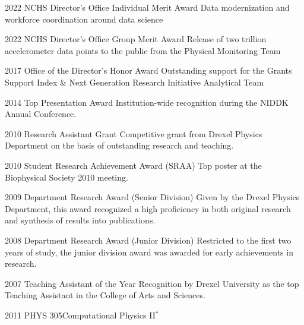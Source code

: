 \documentclass[]{scrartcl}
\begin{document}
\begin{cleanCV}

\newpage


\WorkExperienceX
{2022}
{NCHS Director's Office Individual Merit Award}
{Data modernization and workforce coordination around data science}

\WorkExperienceX
{2022}
{NCHS Director's Office Group Merit Award}
{Release of two trillion accelerometer data points to the public from the Physical Monitoring Team}

\WorkExperienceX
{2017}
{Office of the Director's Honor Award}
{Outstanding support for the Grants Support Index \& Next Generation Research Initiative Analytical Team}

\WorkExperienceX
{2014}
{Top Presentation Award}
{Institution-wide recognition during the NIDDK Annual Conference.}

\WorkExperienceX
{2010}
{Research Assistant Grant}
{Competitive grant from Drexel Physics Department on the basis of outstanding research and teaching.}

\WorkExperienceX
{2010}
{Student Research Achievement Award (SRAA)}
{Top poster at the Biophysical Society 2010 meeting. }

\WorkExperienceX
{2009}
{Department Research Award (Senior Division)}
{Given by the Drexel Physics Department, this award recognized a high proficiency in both original research and synthesis of results into publications.}

\WorkExperienceX
{2008}
{Department Research Award (Junior Division)}
{Restricted to the first two years of study, the junior division award was awarded for early achievements in research.}

\WorkExperienceX
{2007}
{Teaching Assistant of the Year}
{Recognition by Drexel University as the top Teaching Assistant in the College of Arts and Sciences.}







\newcommand{\TeachingNote}{$^*$}

\Teaching
{2011}
{PHYS 305}{Computational Physics II\TeachingNote}


\end{cleanCV}
\end{document}

